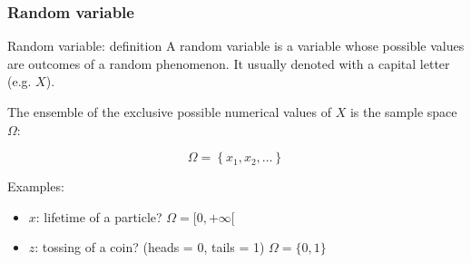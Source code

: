\documentclass[9pt]{beamer}
\begin{document}
\begin{frame}
 \frametitle{Random variable}
 
 
 \begin{block}{Random variable: definition}
  A random variable is a variable whose possible values are outcomes of a random phenomenon. It usually denoted with a capital letter (e.g. $X$).
  
  The ensemble of the exclusive possible numerical values of $X$ is the sample space $\Omega$:
  
  $$\Omega = \left\{ x_1, x_2, \dots \right\}$$
 \end{block}
 
 Examples:
 
 \begin{itemize}
  \item<2-> $x$: lifetime of a particle? $\Omega = [0, +\infty [$
  \item<3> $z$: tossing of a coin? (heads = 0, tails = 1) $\Omega = \{0,1\}$
 \end{itemize}
\end{frame}
\end{document}
